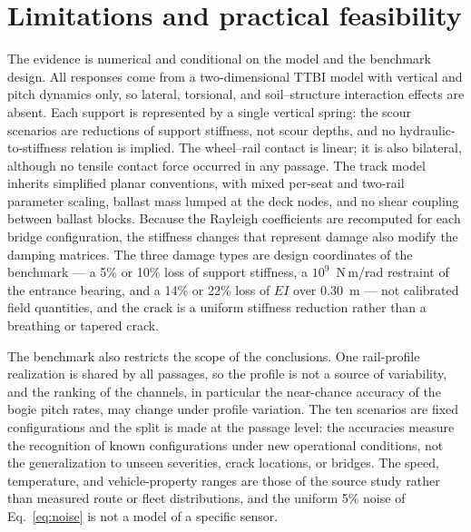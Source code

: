 \section{Limitations and practical feasibility}
\label{sec:limitations}

The evidence is numerical and conditional on the model and the benchmark
design. All responses come from a two-dimensional TTBI model with vertical and
pitch dynamics only, so lateral, torsional, and soil--structure interaction
effects are absent. Each support is represented by a single vertical spring:
the scour scenarios are reductions of support stiffness, not scour depths, and
no hydraulic-to-stiffness relation is implied. The wheel--rail contact is
linear; it is also bilateral, although no tensile contact force occurred in any
passage. The track model inherits simplified planar conventions,
with mixed per-seat and two-rail parameter scaling, ballast mass lumped at the
deck nodes, and no shear coupling between ballast blocks. Because the Rayleigh
coefficients are recomputed for each bridge configuration, the stiffness
changes that represent damage also modify the damping matrices. The three
damage types are design coordinates of the benchmark --- a 5\% or 10\% loss of
support stiffness, a $10^{9}$~N\,m/rad restraint of the entrance bearing, and a
14\% or 22\% loss of $EI$ over 0.30~m --- not calibrated field quantities, and
the crack is a uniform stiffness reduction rather than a breathing or tapered
crack.

The benchmark also restricts the scope of the conclusions. One rail-profile
realization is shared by all passages, so the profile is not a source of
variability, and the ranking of the channels, in particular the near-chance
accuracy of the bogie pitch rates, may change under profile variation. The ten
scenarios are fixed configurations and the split is made at the passage level:
the accuracies measure the recognition of known configurations under new
operational conditions, not the generalization to unseen severities, crack
locations, or bridges. The speed, temperature, and vehicle-property ranges are
those of the source study rather than measured route or fleet distributions,
and the uniform 5\% noise of Eq.~\eqref{eq:noise} is not a model of a specific
sensor.

